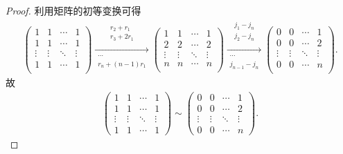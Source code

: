 \documentclass[../../main.tex]{subfiles}
\begin{document}
\begin{proof}
利用矩阵的初等变换可得
\begin{align*}
\left( \begin{matrix}
1&		1&		\cdots&		1\\
1&		1&		\cdots&		1\\
\vdots&		\vdots&		\ddots&		\vdots\\
1&		1&		\cdots&		1\\
\end{matrix} \right) \xrightarrow[\begin{array}{c}
\cdots\\
r_n+\left( n-1 \right) r_1\\
\end{array}]{\begin{array}{c}
r_2+r_1\\
r_3+2r_1\\
\end{array}}\left( \begin{matrix}
1&		1&		\cdots&		1\\
2&		2&		\cdots&		2\\
\vdots&		\vdots&		\ddots&		\vdots\\
n&		n&		\cdots&		n\\
\end{matrix} \right) \xrightarrow[\begin{array}{c}
\cdots\\
j_{n-1}-j_n\\
\end{array}]{\begin{array}{c}
j_1-j_n\\
j_2-j_n\\
\end{array}}\left( \begin{matrix}
0&		0&		\cdots&		1\\
0&		0&		\cdots&		2\\
\vdots&		\vdots&		\ddots&		\vdots\\
0&		0&		\cdots&		n\\
\end{matrix} \right) .
\end{align*}
故
\begin{align*}
\left( \begin{matrix}
1&1&\cdots&1\\
1&1&\cdots&1\\
\vdots&\vdots&\ddots&\vdots\\
1&1&\cdots&1
\end{matrix} \right) 
\sim
\left( \begin{matrix}
0&0&\cdots&1\\
0&0&\cdots&2\\
\vdots&\vdots&\ddots&\vdots\\
0&0&\cdots&n
\end{matrix} \right).
\end{align*} 
\end{proof}
\end{document}
